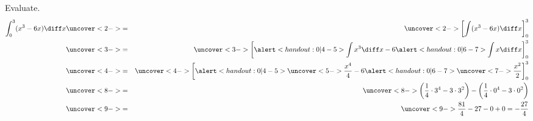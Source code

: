\begin{frame}
\begin{example}[Example 3, p. 326]
Evaluate.
\belowdisplayskip=0pt
\begin{eqnarray*}
\int_0^3 (x^3 - 6x)\diff x %
& \uncover<2->{=} & \uncover<2->{\left[ \int (x^3 - 6x)\diff x  \right]_0^3}\\%
& \uncover<3->{=} & \uncover<3->{\left[ \alert<handout:0| 4-5>{\int x^3 \diff x} - 6\alert<handout:0| 6-7>{\int x \diff x}  \right]_0^3}\\%
& \uncover<4->{=} & \uncover<4->{\left[ \alert<handout:0| 4-5>{\uncover<5->{\frac{x^4}{4}}} - 6\alert<handout:0| 6-7>{\uncover<7->{\frac{x^2}{2}}}  \right]_0^3}\\%
& \uncover<8->{=} & \uncover<8->{ \left( \frac{1}{4} \cdot 3^4 - 3\cdot 3^2 \right) - \left( \frac{1}{4}\cdot 0^4 - 3\cdot 0^2  \right) }\\%
& \uncover<9->{=} & \uncover<9->{ \frac{81}{4} - 27 - 0 + 0 = -\frac{27}{4}}
\end{eqnarray*}
\end{example}
\end{frame}
